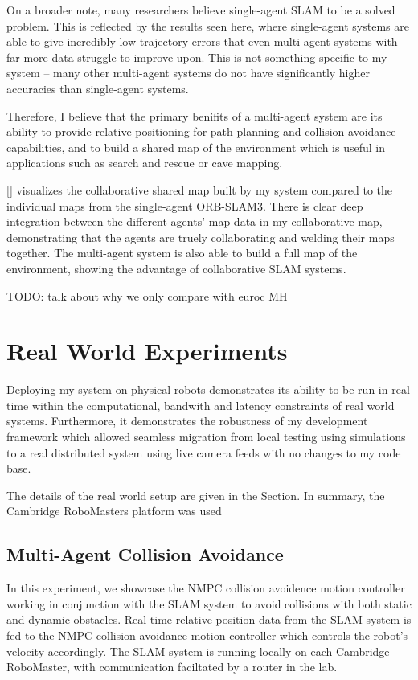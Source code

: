 On a broader note, many researchers believe single-agent SLAM to be a solved problem. This is reflected by the results seen here, where single-agent systems are able to give incredibly low trajectory errors that even multi-agent systems with far more data struggle to improve upon. This is not something specific to my system – many other multi-agent systems do not have significantly higher accuracies than single-agent systems.

Therefore, I believe that the primary benifits of a multi-agent system are its ability to provide relative positioning for path planning and collision avoidance capabilities, and to build a shared map of the environment which is useful in applications such as search and rescue or cave mapping.

\autoref{} visualizes the collaborative shared map built by my system compared to the individual maps from the single-agent ORB-SLAM3. There is clear deep integration between the different agents' map data in my collaborative map, demonstrating that the agents are truely collaborating and welding their maps together. The multi-agent system is also able to build a full map of the environment, showing the advantage of collaborative SLAM systems.

TODO: talk about why we only compare with euroc MH




\section{Real World Experiments}
\label{sec:real-world-experiments}
Deploying my system on physical robots demonstrates its ability to be run in real time within the computational, bandwith and latency constraints of real world systems. Furthermore, it demonstrates the robustness of my development framework which allowed seamless migration from local testing using simulations to a real distributed system using live camera feeds with no changes to my code base.

The details of the real world setup are given in the  Section. In summary, the Cambridge RoboMasters platform was used

\subsection{Multi-Agent Collision Avoidance}
\label{sec:multi-agent-collision-avoidance}
In this experiment, we showcase the NMPC collision avoidence motion controller working in conjunction with the SLAM system to avoid collisions with both static and dynamic obstacles. Real time relative position data from the SLAM system is fed to the NMPC collision avoidance motion controller which controls the robot's velocity accordingly. The SLAM system is running locally on each Cambridge RoboMaster, with communication faciltated by a router in the lab.

